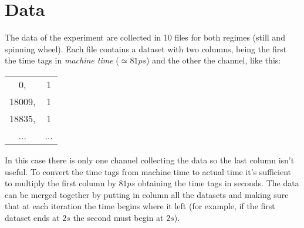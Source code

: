
\section{Data}

The data of the experiment are collected in 10 files for both regimes (still and spinning wheel). Each file contains a dataset with two columns, being the first the time tags in \emph{machine time} ($\simeq 81ps$) and the other the channel, like this:\\
\begin{center}
\begin{tabular}{c c}
0, & 1 \\
18009, & 1 \\
18835, & 1 \\
...  & ...
\end{tabular}
\end{center}
In this case there is only one channel collecting the data so the last column isn't useful. To convert the time tags from machine time to actual time it's sufficient to multiply the first column by $81ps$ obtaining the time tags in seconds. The data can be merged together by putting in column all the datasets and making sure that at each iteration the time begins where it left (for example, if the first dataset ends at $2s$ the second must begin at $2s$).